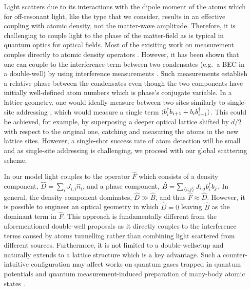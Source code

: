 Light scatters due to its interactions with the dipole moment of the
atoms which for off-resonant light, like the type that we consider,
results in an effective coupling with atomic density, not the
matter-wave amplitude. Therefore, it is challenging to couple light to
the phase of the matter-field as is typical in quantum optics for
optical fields. Most of the exisiting work on measurement couples
directly to atomic density operators \cite{mekhov2012, LP2009,
  rogers2014, ashida2015, ashida2015a}. However, it has been shown
that one can couple to the interference term between two condensates
(e.g.~a BEC in a double-well) by using interference measurements
\cite{cirac1996, castin1997, ruostekoski1997, ruostekoski1998,
  rist2012}. Such measurements establish a relative phase between the
condensates even though the two components have initially well-defined
atom numbers which is phase's conjugate variable. In a lattice
geometry, one would ideally measure between two sites similarly to
single-site addressing \cite{greiner2009, bloch2011}, which would
measure a single term $\langle b^\dagger_i b_{i+1}+b_i
b^\dagger_{i+1}\rangle$. This could be achieved, for example, by superposing
a deeper optical lattice shifted by $d/2$ with respect to the original
one, catching and measuring the atoms in the new lattice
sites. However, a single-shot success rate of atom detection will be
small and as single-site addressing is challenging, we proceed with
our global scattering scheme.

In our model light couples to the operator $\hat{F}$ which consists of
a density component, $\hat{D} = \sum_i J_{i,i} \hat{n}_i$, and a phase
component, $\hat{B} = \sum_{\langle i, j \rangle} J_{i,j} b^\dagger_i
b_j$. In general, the density component dominates,
$\hat{D} \gg \hat{B}$, and thus $\hat{F} \approx \hat{D}$.  However,
it is possible to engineer an optical geometry in which $\hat{D} = 0$
leaving $\hat{B}$ as the dominant term in $\hat{F}$. This approach is
fundamentally different from the aforementioned double-well proposals
as it directly couples to the interference terms caused by atoms
tunnelling rather than combining light scattered from different
sources. Furthermore, it is not limited to a double-wellsetup and
naturally extends to a lattice structure which is a key
advantage. Such a counter-intuitive configuration may affect works on
quantum gases trapped in quantum potentials \cite{mekhov2012,
  mekhov2008, larson2008, chen2009, habibian2013, ivanov2014,
  caballero2015} and quantum measurement-induced preparation of
many-body atomic states \cite{mazzucchi2016, mekhov2009prl,
  pedersen2014, elliott2015}.


